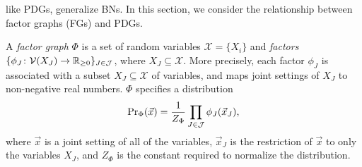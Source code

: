 \documentclass{article}
\begin{document}
	like PDGs, generalize BNs.
	In this section, we consider the relationship between factor graphs (FGs) and PDGs.
	\begin{defn}
	 A \emph{factor graph} $\Phi$ is a set of random variables
	        $\mathcal X = \{X_i\}$ and \emph{factors}
	       $\{\phi_J\colon \mathcal V(X_J) \to \mathbb R_{\geq0}\}_{J \in
	\mathcal J }$,
	where $X_J \subseteq \mathcal X$.  
	More precisely, each factor $\phi_J$ is associated with a subset
	$X_J\subseteq \mathcal{X}$ of variables, and maps
	joint settings of $X_J$ to non-negative real numbers.
	$\Phi$ specifies a distribution
	\[ {\Pr}_{\Phi}(\vec x) = \frac{1}{Z_{\Phi}}
	 	\prod_{J \in \cal J} \phi_J(\vec x_J), \]
	where $\vec{x}$ is a joint setting of all of the variables,
	 $\vec{x}_J$ is the restriction of $\vec{x}$ to only the
	 variables $X_J$, and $Z_{\Phi}$ is the constant required to
	 normalize the distribution.  
	\end{defn}
	
	
	
	
\end{document}
